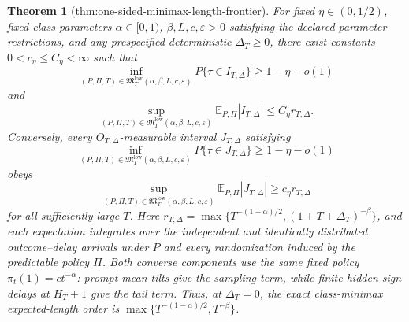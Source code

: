 \documentclass{article}
\newtheorem{theorem}{Theorem}
\begin{document}
\begin{theorem}[thm:one-sided-minimax-length-frontier]\label{thm:one-sided-minimax-length-frontier}
For fixed \(\eta\in(0,1/2)\), fixed class parameters \(\alpha\in[0,1)\), \(\beta,L,c,\varepsilon>0\) satisfying the declared parameter restrictions, and any prespecified deterministic \(\Delta_T\geq0\), there exist constants \(0<c_\eta\leq C_\eta<\infty\) such that
\[
 \inf_{(P,\Pi,T)\in\mathfrak M_T^{\mathrm{low}}(\alpha,\beta,L,c,\varepsilon)}
 P\{\tau\in I_{T,\Delta}\}\geq1-\eta-o(1)
\]
and
\[
 \sup_{(P,\Pi,T)\in\mathfrak M_T^{\mathrm{low}}(\alpha,\beta,L,c,\varepsilon)}
 \mathbb E_{P,\Pi}|I_{T,\Delta}|\leq C_\eta r_{T,\Delta}.
\]
Conversely, every \(O_{T,\Delta}\)-measurable interval \(J_{T,\Delta}\) satisfying
\[
 \inf_{(P,\Pi,T)\in\mathfrak M_T^{\mathrm{low}}(\alpha,\beta,L,c,\varepsilon)}
 P\{\tau\in J_{T,\Delta}\}\geq1-\eta-o(1)
\]
obeys
\[
 \sup_{(P,\Pi,T)\in\mathfrak M_T^{\mathrm{low}}(\alpha,\beta,L,c,\varepsilon)}
 \mathbb E_{P,\Pi}|J_{T,\Delta}|\geq c_\eta r_{T,\Delta}
\]
for all sufficiently large \(T\). Here \(r_{T,\Delta}=\max\{T^{-(1-\alpha)/2},(1+T+\Delta_T)^{-\beta}\}\), and each expectation integrates over the independent and identically distributed outcome--delay arrivals under \(P\) and every randomization induced by the predictable policy \(\Pi\). Both converse components use the same fixed policy \(\pi_t(1)=ct^{-\alpha}\): prompt mean tilts give the sampling term, while finite hidden-sign delays at \(H_T+1\) give the tail term. Thus, at \(\Delta_T=0\), the exact class-minimax expected-length order is \(\max\{T^{-(1-\alpha)/2},T^{-\beta}\}\).
\end{theorem}
\end{document}
